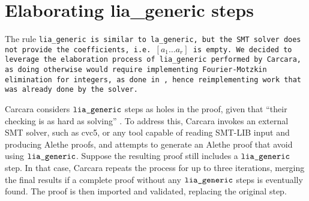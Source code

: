 \section{Elaborating lia\_generic steps}
\label{sec:elaboration-lia}

The rule \tt{lia\_generic} is similar to \tt{la\_generic}, but the SMT solver does not provide the coefficients,
i.e.\ \colorbox{orange!30}{$[a_1 \dots a_r]$} is empty.
We decided to leverage the elaboration process of \tt{lia\_generic} performed by Carcara, as doing otherwise would require implementing Fourier-Motzkin elimination for integers, as done in \cite{micromega,omegatest}, hence reimplementing work that was already done by the solver.

Carcara considers $\tt{lia\_generic}$ steps as holes in the proof, given that ``their checking is as hard as solving'' \cite[\S 3.2]{carcara}.
To address this, Carcara invokes an external SMT solver, such as cvc5, or any tool capable of reading SMT-LIB input and producing Alethe proofs, and attempts to generate an Alethe proof that avoid using $\tt{lia\_generic}$. 
Suppose the resulting proof still includes a $\tt{lia\_generic}$ step. In that case, Carcara repeats the process for up to three iterations, merging the final results if a complete proof without any $\tt{lia\_generic}$ steps is eventually found.
The proof is then imported and validated, replacing the original step.

